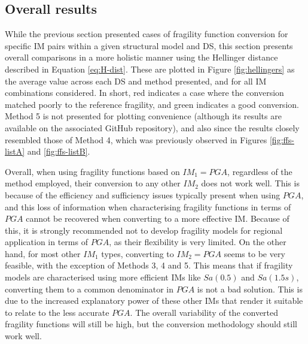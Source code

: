 \subsection{Overall results}

While the previous section presented cases of fragility function conversion for specific \ac{IM} pairs within a given structural model and \ac{DS}, this section presents overall comparisons in a more holistic manner using the Hellinger distance described in Equation \eqref{eq:H-dist}. These are plotted in Figure \ref{fig:hellingers} as the average value across each \ac{DS} and method presented, and for all \ac{IM} combinations considered. In short, red indicates a case where the conversion matched poorly to the reference fragility, and green indicates a good conversion. Method 5 is not presented for plotting convenience (although its results are available on the associated GitHub repository), and also since the results closely resembled those of Method 4, which was previously observed in Figures \ref{fig:ffs-listA} and \ref{fig:ffs-listB}.

Overall, when using fragility functions based on $IM_1=PGA$, regardless of the method employed, their conversion to any other $IM_2$ does not work well. This is because of the efficiency and sufficiency issues typically present when using $PGA$, and this loss of information when characterising fragility functions in terms of $PGA$ cannot be recovered when converting to a more effective \ac{IM}. Because of this, it is strongly recommended not to develop fragility models for regional application in terms of $PGA$, as their flexibility is very limited. On the other hand, for most other $IM_1$ types, converting to $IM_2=PGA$ seems to be very feasible, with the exception of Methods 3, 4 and 5. This means that if fragility models are characterised using more efficient \acp{IM} like $Sa(0.5)$ and $Sa(1.5s)$, converting them to a common denominator in $PGA$ is not a bad solution. This is due to the increased explanatory power of these other \acp{IM} that render it suitable to relate to the less accurate $PGA$. The overall variability of the converted fragility functions will still be high, but the conversion methodology should still work well. 

